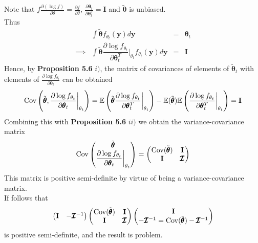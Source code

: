 \documentclass[11pt,a4paper]{article}
\begin{document}
Note that $f\frac{\partial(\log f)}{\partial\theta}=\frac{\partial f}{\partial\theta}$, $\frac{\partial\pmb\theta_t}{\partial\pmb\theta_t^T}=\textbf{I}$ and $\tilde{\pmb\theta}$ is unbiased.\\
Thus
\[\begin{array}{rrcl}
&\displaystyle\int\tilde{\pmb\theta}f_{\theta_t}(\textbf{y})d\textbf{y}&=&\pmb\theta_t\\
\implies&\displaystyle\int\tilde{\pmb\theta}\dfrac{\partial\log f_{\theta_t}}{\partial\pmb\theta_t^T}\bigg|_{\theta_t}f_{\theta_t}(\textbf{y})d\textbf{y}&=&\textbf{I}
\end{array}\]
Hence, by \textbf{Proposition 5.6} $i)$, the matrix of covariances of elements of $\tilde{\pmb\theta}_t$ with elements of $\frac{\partial\log f_{\theta_t}}{\partial\pmb\theta_t}$ can be obtained
$$\mathrm{Cov}\left(\tilde{\pmb\theta},\frac{\partial\log f_{\theta_t}}{\partial\pmb\theta_t}\bigg|_{\theta_t}\right)=\mathbb{E}\left(\tilde{\pmb\theta}\dfrac{\partial\log f_{\theta_t}}{\partial\pmb\theta_t^T}\bigg|_{\theta_t}\right)-\mathbb{E}(\tilde{\pmb\theta})\mathbb{E}\left(\dfrac{\partial\log f_{\theta_t}}{\partial\pmb\theta_t^T}\bigg|_{\theta_t}\right)=\textbf{I}$$
Combining this with \textbf{Proposition 5.6} $ii)$ we obtain the variance-covariance matrix
$$\mathrm{Cov}\begin{pmatrix}\tilde{\pmb\theta}\\\dfrac{\partial\log f_{\theta_t}}{\partial\pmb\theta_t}\bigg|_{\theta_t}\end{pmatrix}=\begin{pmatrix}\mathrm{Cov}(\tilde{\pmb\theta})&\textbf{I}\\\textbf{I}&\pmb{\mathcal{I}}\end{pmatrix}$$
This matrix is positive semi-definite by virtue of being a variance-covariance matrix.\\
If follows that
$$\begin{pmatrix}\textbf{I}&-\pmb{\mathcal{I}}^{-1}\end{pmatrix}\begin{pmatrix}\mathrm{Cov}(\tilde{\pmb\theta})&\textbf{I}\\\textbf{I}&\pmb{\mathcal{I}}\end{pmatrix}\begin{pmatrix}\textbf{I}\\-\pmb{\mathcal{I}}^{-1}=\mathrm{Cov}(\tilde{\pmb\theta})-\pmb{\mathcal{I}}^{-1}\end{pmatrix}$$
is positive semi-definite, and the result is problem.\\
\end{document}
